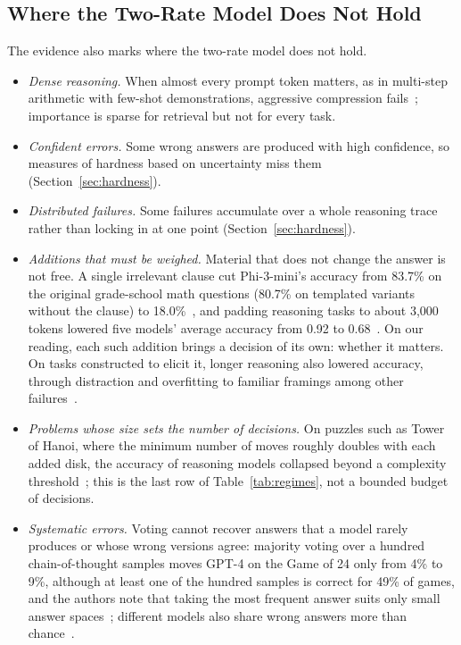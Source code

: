 \documentclass{ieeeaccess}
\begin{document}
\subsection{Where the Two-Rate Model Does Not Hold}
The evidence also marks where the two-rate model does not hold.
\begin{itemize}
\item \emph{Dense reasoning.} When almost every prompt token matters, as in multi-step arithmetic with few-shot demonstrations, aggressive compression fails~\cite{liu2026semantic}; importance is sparse for retrieval but not for every task.
\item \emph{Confident errors.} Some wrong answers are produced with high confidence, so measures of hardness based on uncertainty miss them (Section~\ref{sec:hardness}).
\item \emph{Distributed failures.} Some failures accumulate over a whole reasoning trace rather than locking in at one point (Section~\ref{sec:hardness}).
\item \emph{Additions that must be weighed.} Material that does not change the answer is not free. A single irrelevant clause cut Phi-3-mini's accuracy from 83.7\% on the original grade-school math questions (80.7\% on templated variants without the clause) to 18.0\%~\cite{mirzadeh2025gsmsymbolic}, and padding reasoning tasks to about 3{,}000 tokens lowered five models' average accuracy from 0.92 to 0.68~\cite{levy2024same}. On our reading, each such addition brings a decision of its own: whether it matters. On tasks constructed to elicit it, longer reasoning also lowered accuracy, through distraction and overfitting to familiar framings among other failures~\cite{gema2025inverse}.
\item \emph{Problems whose size sets the number of decisions.} On puzzles such as Tower of Hanoi, where the minimum number of moves roughly doubles with each added disk, the accuracy of reasoning models collapsed beyond a complexity threshold~\cite{shojaee2025illusion}; this is the last row of Table~\ref{tab:regimes}, not a bounded budget of decisions.
\item \emph{Systematic errors.} Voting cannot recover answers that a model rarely produces or whose wrong versions agree: majority voting over a hundred chain-of-thought samples moves GPT-4 on the Game of 24 only from 4\% to 9\%, although at least one of the hundred samples is correct for 49\% of games, and the authors note that taking the most frequent answer suits only small answer spaces~\cite{yao2023tree}; different models also share wrong answers more than chance~\cite{kim2025correlated}.
\end{itemize}
\end{document}
